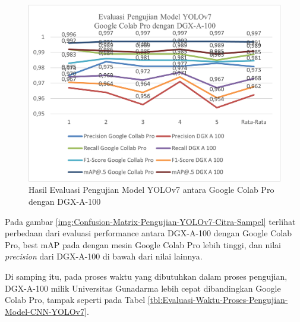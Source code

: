 \begin{figure}[H]
	\vspace{-0.1cm}
	\begin{center}
		\includegraphics[width=1\columnwidth]{bab4/Gambar/Picture32.png}
	\end{center}
	\vspace{-0.2cm}
	\captionsetup{justification=centering}
	\caption{Hasil Evaluasi Pengujian Model YOLOv7 antara Google Colab Pro dengan DGX-A-100}\label{img:Hasil-Evaluasi-Pengujian-Model-YOLOv7}
\end{figure}

Pada gambar \ref{img:Confusion-Matrix-Pengujian-YOLOv7-Citra-Sampel} terlihat perbedaan dari evaluasi performance antara DGX-A-100 dengan Google Colab Pro, best mAP pada dengan mesin Google Colab Pro lebih tinggi, dan nilai \textit{precision} dari DGX-A-100 di bawah dari nilai lainnya.

Di samping itu, pada proses waktu yang dibutuhkan dalam proses pengujian, DGX-A-100 milik Universitas Gunadarma lebih cepat dibandingkan Google Colab Pro, tampak seperti pada Tabel \ref{tbl:Evaluasi-Waktu-Proses-Pengujian-Model-CNN-YOLOv7}. 

